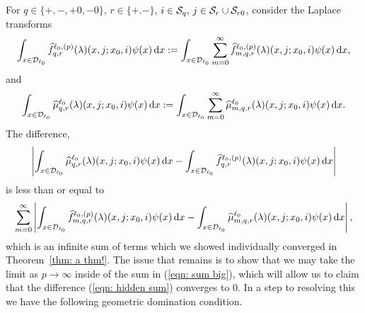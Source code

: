 
For \(q\in\{+,-,+0,-0\}\), \(r\in\{+.-\}\), \(i\in\mathcal{S}_q,\,j\in\mathcal{S}_r\cup\mathcal{S}_{r0}\), consider the Laplace transforms 
\[\int_{x\in\mathcal{D}_{\ell_0}} \widehat f^{\ell_0,(p)}_{q,r}(\lambda)(x,j;x_0,i)\psi(x)\, \mathrm{d} x := \int_{x\in\mathcal{D}_{\ell_0}} \sum_{m=0}^\infty \widehat f^{\ell_0,(p)}_{m,q,r}(\lambda)(x,j;x_0,i)\psi(x) \, \mathrm{d} x,\]
and
\[\int_{x\in\mathcal{D}_{\ell_0}} \widehat \mu^{\ell_0}_{q,r}(\lambda)( x,j;x_0,i)\psi(x) \, \mathrm{d} x := \int_{x\in\mathcal{D}_{\ell_0}} \sum_{m=0}^\infty \widehat \mu^{\ell_0}_{m,q,r}(\lambda)( x,j;x_0,i)\psi(x) \, \mathrm{d} x.\]
The difference, 
\begin{align}\left|\int_{x\in\mathcal{D}_{\ell_0}} \widehat \mu^{\ell_0}_{q,r}(\lambda)( x,j;x_0,i)\psi(x)\, \mathrm{d} x  - \int_{x\in\mathcal{D}_{\ell_0}} \widehat f^{\ell_0,(p)}_{q,r}(\lambda)(x,j;x_0,i)\psi(x) \, \mathrm{d} x \right|\label{eqn: hidden sum}\end{align}
is less than or equal to 
\begin{align}\sum_{m=0}^\infty \left| \int_{x\in\mathcal{D}_{\ell_0}} \widehat f^{\ell_0,(p)}_{m,q,r}(\lambda)(x,j;x_0,i)\psi(x)\, \mathrm{d} x - \int_{x\in\mathcal{D}_{\ell_0}}  \widehat \mu^{\ell_0}_{m,q,r}(\lambda)(x,j;x_0,i)\psi(x) \, \mathrm{d} x\right|,\label{eqn: sum big}\end{align}
which is an infinite sum of terms which we showed individually converged in Theorem~\ref{thm: a thm!}. The issue that remains is to show that we may take the limit as \(p\to\infty\) inside of the sum in (\ref{eqn: sum big}), which will allow us to claim that the difference (\ref{eqn: hidden sum}) converges to 0. In a step to resolving this we have the following geometric domination condition. 

